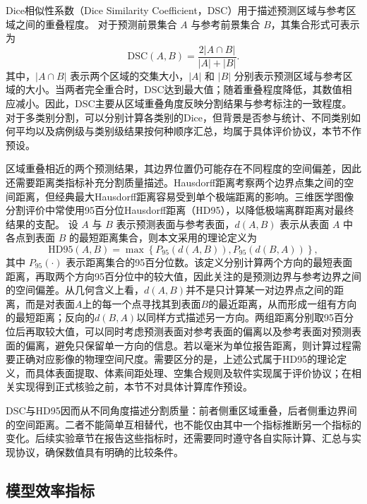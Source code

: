 Dice相似性系数（Dice Similarity Coefficient，DSC）用于描述预测区域与参考区域之间的重叠程度。\cite{dice1945measures,taha2015metrics} 对于预测前景集合 \(A\) 与参考前景集合 \(B\)，其集合形式可表示为
\begin{equation}
\label{eq:ch2-dsc}
\mathrm{DSC}(A,B)
=
\frac{2|A\cap B|}{|A|+|B|}.
\end{equation}
其中，\(|A\cap B|\) 表示两个区域的交集大小，\(|A|\) 和 \(|B|\) 分别表示预测区域与参考区域的大小。当两者完全重合时，DSC达到最大值；随着重叠程度降低，其数值相应减小。因此，DSC主要从区域重叠角度反映分割结果与参考标注的一致程度。对于多类别分割，可以分别计算各类别的Dice，但背景是否参与统计、不同类别如何平均以及病例级与类别级结果按何种顺序汇总，均属于具体评价协议，本节不作预设。

区域重叠相近的两个预测结果，其边界位置仍可能存在不同程度的空间偏差，因此还需要距离类指标补充分割质量描述。Hausdorff距离考察两个边界点集之间的空间距离，但经典最大Hausdorff距离容易受到单个极端距离的影响。三维医学图像分割评价中常使用95百分位Hausdorff距离（HD95），以降低极端离群距离对最终结果的支配。\cite{taha2015metrics} 设 \(A\) 与 \(B\) 表示预测表面与参考表面，\(d(A,B)\) 表示从表面 \(A\) 中各点到表面 \(B\) 的最短距离集合，则本文采用的理论定义为
\begin{equation}
\label{eq:ch2-hd95}
\mathrm{HD95}(A,B)
=
\max\left\{
P_{95}\!\left(d(A,B)\right),
P_{95}\!\left(d(B,A)\right)
\right\},
\end{equation}
其中 \(P_{95}(\cdot)\) 表示距离集合的95百分位数。该定义分别计算两个方向的最短表面距离，再取两个方向95百分位中的较大值，因此关注的是预测边界与参考边界之间的空间偏差。从几何含义上看，\(d(A,B)\)并不是只计算某一对边界点之间的距离，而是对表面\(A\)上的每一个点寻找其到表面\(B\)的最近距离，从而形成一组有方向的最短距离；反向的\(d(B,A)\)以同样方式描述另一方向。两组距离分别取95百分位后再取较大值，可以同时考虑预测表面对参考表面的偏离以及参考表面对预测表面的偏离，避免只保留单一方向的信息。若以毫米为单位报告距离，则计算过程需要正确对应影像的物理空间尺度。需要区分的是，上述公式属于HD95的理论定义，而具体表面提取、体素间距处理、空集合规则及软件实现属于评价协议；在相关实现得到正式核验之前，本节不对具体计算库作预设。

DSC与HD95因而从不同角度描述分割质量：前者侧重区域重叠，后者侧重边界间的空间距离。二者不能简单互相替代，也不能仅由其中一个指标推断另一个指标的变化。后续实验章节在报告这些指标时，还需要同时遵守各自实际计算、汇总与实现协议，确保数值具有明确的比较条件。

\subsection{模型效率指标}

